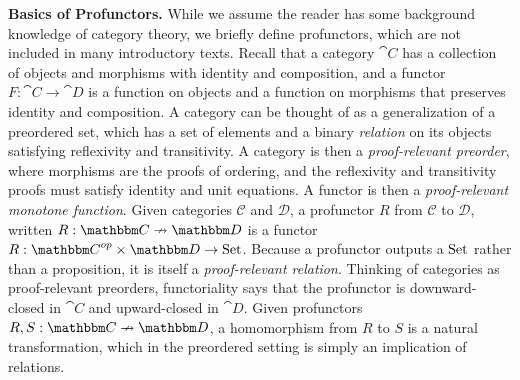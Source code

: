\documentclass{llncs}
\begin{document}
\textbf{Basics of Profunctors.}  While we assume the reader has some
background knowledge of category theory, we briefly define profunctors,
which are not included in many introductory texts.  Recall that a
category $\cat C$ has a collection of objects and morphisms with
identity and composition, and a functor $F : \cat C \to \cat D$ is a
function on objects and a function on morphisms that preserves identity
and composition.  A category can be thought of as a generalization of a
preordered set, which has a set of elements and a binary \emph{relation}
on its objects satisfying reflexivity and transitivity.  A category is
then a \emph{proof-relevant preorder}, where morphisms are the proofs of
ordering, and the reflexivity and transitivity proofs must satisfy identity and
unit equations. A functor is then a \emph{proof-relevant monotone
  function}.  Given categories $\mathcal C$ and $\mathcal D$, a
profunctor $R$ from $\mathcal C$ to $\mathcal D$, written $R : \cat C
\pto \cat D$ is a functor $R : {\cat C}^{op} \times {\cat D} \to \Set$.
Because a profunctor outputs a $\textrm{Set}$ rather than a proposition, it is
itself a \emph{proof-relevant relation}.  Thinking of categories as
proof-relevant preorders, functoriality says that the profunctor is
downward-closed in $\cat C$ and upward-closed in $\cat D$.  Given
profunctors $R, S : \cat C \pto \cat D$, a homomorphism from $R$ to $S$
is a natural transformation, which in the preordered setting is
simply an implication of relations.

\end{document}

